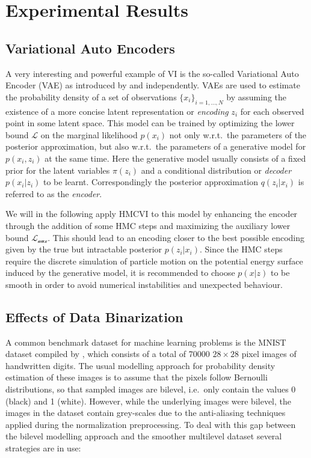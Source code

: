 \section{Experimental Results}
\label{sec:Experiments}
\subsection{Variational Auto Encoders}

A very interesting and powerful example of VI is the so-called Variational Auto Encoder (VAE) as introduced by \parencite{Kingma2014} and \parencite{Rezende2014} independently. VAEs are used to estimate the probability density of a set of observations $\{x_i\}_{i=1, \dots, N}$ by assuming the existence of a more concise latent representation or \textit{encoding} $z_i$ for each observed point in some latent space. This model can be trained by optimizing the lower bound $\mathcal{L}$ on the marginal likelihood $p(x_i)$ not only w.r.t.\ the parameters of the posterior approximation, but also w.r.t.\ the parameters of a generative model for $p(x_i, z_i)$ at the same time. Here the generative model usually consists of a fixed prior for the latent variables $\pi(z_i)$ and a conditional distribution or \textit{decoder} $p(x_i|z_i)$ to be learnt. Correspondingly the posterior approximation $q(z_i|x_i)$ is referred to as the \textit{encoder}.

We will in the following apply HMCVI to this model by enhancing the encoder through the addition of some HMC steps and maximizing the auxiliary lower bound $\mathcal{L_\textrm{aux}}$. This should lead to an encoding closer to the best possible encoding given by the true but intractable posterior $p(z_i|x_i)$. Since the HMC steps require the discrete simulation of particle motion on the potential energy surface induced by the generative model, it is recommended to choose $p(x|z)$ to be smooth in order to avoid numerical instabilities and unexpected behaviour.

\subsection{Effects of Data Binarization}

A common benchmark dataset for machine learning problems is the MNIST dataset compiled by \parencite{LeCun1998}, which consists of a total of 70000 $28 \times 28$ pixel images of handwritten digits. The usual modelling approach for probability density estimation of these images is to assume that the pixels follow Bernoulli distributions, so that sampled images are bilevel, i.e.\ only contain the values 0 (black) and 1 (white). However, while the underlying images were bilevel, the images in the dataset contain grey-scales due to the anti-aliasing techniques applied during the normalization preprocessing. To deal with this gap between the bilevel modelling approach and the smoother multilevel dataset several strategies are in use:

